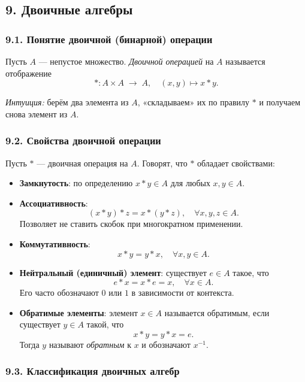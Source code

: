 \subsection{9. Двоичные алгебры}

\subsubsection{9.1. Понятие двоичной (бинарной) операции}

\begin{definition}
Пусть $A$ — непустое множество. \emph{Двоичной операцией} на $A$ называется отображение
\[
  * : A \times A \;\longrightarrow\; A,
  \quad (x,y)\mapsto x*y.
\]
\end{definition}

\emph{Интуиция:} берём два элемента из $A$, «складываем» их по правилу $*$ и получаем снова элемент из $A$.

\subsubsection{9.2. Свойства двоичной операции}

Пусть $*$ — двоичная операция на $A$. Говорят, что $*$ обладает свойствами:

\begin{itemize}[leftmargin=*]
  \item \textbf{Замкнутость}: по определению $x*y\in A$ для любых $x,y\in A$.
  \item \textbf{Ассоциативность}:
    \[
      (x*y)*z = x*(y*z),\quad \forall x,y,z\in A.
    \]
    Позволяет не ставить скобок при многократном применении.
  \item \textbf{Коммутативность}:
    \[
      x*y = y*x,\quad \forall x,y\in A.
    \]
  \item \textbf{Нейтральный (единичный) элемент}: существует $e\in A$ такое, что
    \[
      e*x = x*e = x,\quad \forall x\in A.
    \]
    Его часто обозначают $0$ или $1$ в зависимости от контекста.
  \item \textbf{Обратимые элементы}: элемент $x\in A$ называется обратимым, если существует $y\in A$ такой, что
    \[
      x*y = y*x = e.
    \]
    Тогда $y$ называют \emph{обратным} к $x$ и обозначают $x^{-1}$.
\end{itemize}

\subsubsection{9.3. Классификация двоичных алгебр}

